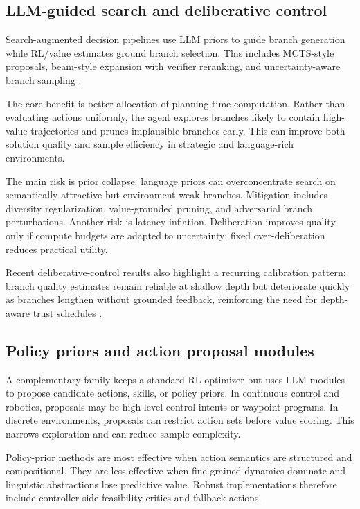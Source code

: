 \documentclass[pdflatex,sn-mathphys-num]{sn-jnl}
\begin{document}
\subsection{LLM-guided search and deliberative control}
Search-augmented decision pipelines use LLM priors to guide branch generation while RL/value estimates ground branch selection. This includes MCTS-style proposals, beam-style expansion with verifier reranking, and uncertainty-aware branch sampling \cite{arxiv_p_2602_03719,arxiv_p_2602_06493,arxiv_p_2602_07848,doi_p_10_48448_q4pk_2g71}.

The core benefit is better allocation of planning-time computation. Rather than evaluating actions uniformly, the agent explores branches likely to contain high-value trajectories and prunes implausible branches early. This can improve both solution quality and sample efficiency in strategic and language-rich environments.

The main risk is prior collapse: language priors can overconcentrate search on semantically attractive but environment-weak branches. Mitigation includes diversity regularization, value-grounded pruning, and adversarial branch perturbations. Another risk is latency inflation. Deliberation improves quality only if compute budgets are adapted to uncertainty; fixed over-deliberation reduces practical utility.

Recent deliberative-control results also highlight a recurring calibration pattern: branch quality estimates remain reliable at shallow depth but deteriorate quickly as branches lengthen without grounded feedback, reinforcing the need for depth-aware trust schedules \cite{arxiv_p_2601_06845,arxiv_p_2602_03719,arxiv_p_2602_06493}.

\subsection{Policy priors and action proposal modules}
A complementary family keeps a standard RL optimizer but uses LLM modules to propose candidate actions, skills, or policy priors. In continuous control and robotics, proposals may be high-level control intents or waypoint programs. In discrete environments, proposals can restrict action sets before value scoring. This narrows exploration and can reduce sample complexity.

Policy-prior methods are most effective when action semantics are structured and compositional. They are less effective when fine-grained dynamics dominate and linguistic abstractions lose predictive value. Robust implementations therefore include controller-side feasibility critics and fallback actions.
\end{document}
